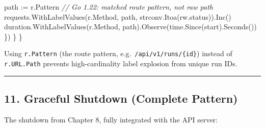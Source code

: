 \documentclass[
]{article}
\newenvironment{Shaded}{}{}
\newcommand{\CommentTok}[1]{\textcolor[rgb]{0.38,0.63,0.69}{\textit{#1}}}
\newcommand{\NormalTok}[1]{#1}
\newcommand{\OperatorTok}[1]{\textcolor[rgb]{0.40,0.40,0.40}{#1}}
\begin{document}
\begin{Shaded}
\begin{Highlighting}[]
\NormalTok{            path }\OperatorTok{:=}\NormalTok{ r}\OperatorTok{.}\NormalTok{Pattern }\CommentTok{// Go 1.22: matched route pattern, not raw path}
\NormalTok{            requests}\OperatorTok{.}\NormalTok{WithLabelValues}\OperatorTok{(}\NormalTok{r}\OperatorTok{.}\NormalTok{Method}\OperatorTok{,}\NormalTok{ path}\OperatorTok{,}\NormalTok{ strconv}\OperatorTok{.}\NormalTok{Itoa}\OperatorTok{(}\NormalTok{rw}\OperatorTok{.}\NormalTok{status}\OperatorTok{)).}\NormalTok{Inc}\OperatorTok{()}
\NormalTok{            duration}\OperatorTok{.}\NormalTok{WithLabelValues}\OperatorTok{(}\NormalTok{r}\OperatorTok{.}\NormalTok{Method}\OperatorTok{,}\NormalTok{ path}\OperatorTok{).}\NormalTok{Observe}\OperatorTok{(}\NormalTok{time}\OperatorTok{.}\NormalTok{Since}\OperatorTok{(}\NormalTok{start}\OperatorTok{).}\NormalTok{Seconds}\OperatorTok{())}
        \OperatorTok{\})}
    \OperatorTok{\}}
\OperatorTok{\}}
\end{Highlighting}
\end{Shaded}

Using \texttt{r.Pattern} (the route pattern,
e.g.~\texttt{/api/v1/runs/\{id\}}) instead of \texttt{r.URL.Path}
prevents high-cardinality label explosion from unique run IDs.

\begin{center}\rule{0.5\linewidth}{0.5pt}\end{center}

\hypertarget{graceful-shutdown-complete-pattern}{%
\subsection{11. Graceful Shutdown (Complete
Pattern)}\label{graceful-shutdown-complete-pattern}}

The shutdown from Chapter 8, fully integrated with the API server:
\end{document}
